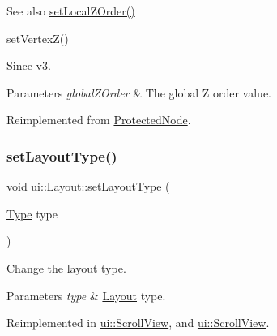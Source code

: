 \begin{DoxySeeAlso}{See also}
{\ttfamily \hyperlink{classNode_aee4e616c2d55b722226aae1e68b4946f}{set\+Local\+Z\+Order()}} 

{\ttfamily set\+Vertex\+Z()}
\end{DoxySeeAlso}
\begin{DoxySince}{Since}
v3.
\end{DoxySince}

\begin{DoxyParams}{Parameters}
{\em global\+Z\+Order} & The global Z order value. \\
\hline
\end{DoxyParams}


Reimplemented from \hyperlink{classProtectedNode_a0d067b9056a934255c7a44a675dc9e92}{Protected\+Node}.

\mbox{\label{classui_1_1Layout_a79c8c32f381022f2da2984b6f03d711c}} 
\subsubsection{\texorpdfstring{set\+Layout\+Type()}{setLayoutType()}\hspace{0.1cm}{\footnotesize\ttfamily [1/2]}}
{\footnotesize\ttfamily void ui\+::\+Layout\+::set\+Layout\+Type (\begin{DoxyParamCaption}\item[{\hyperlink{classui_1_1Layout_aecabbc1592677eadd6757edc1df5b952}{Type}}]{type }\end{DoxyParamCaption})\hspace{0.3cm}{\ttfamily [virtual]}}

Change the layout type. 
\begin{DoxyParams}{Parameters}
{\em type} & \hyperlink{classui_1_1Layout}{Layout} type. \\
\hline
\end{DoxyParams}


Reimplemented in \hyperlink{classui_1_1ScrollView_a4056a0a2c5653b6e00fa983740f621d9}{ui\+::\+Scroll\+View}, and \hyperlink{classui_1_1ScrollView_a3dc215785981958746d0e12ef5ce5d92}{ui\+::\+Scroll\+View}.

\mbox{\label{classui_1_1Layout_a3b9f71278c331fd042b9634e1a654fce}} 

